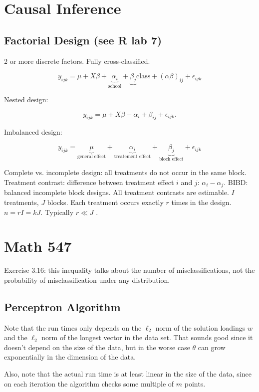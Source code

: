 \section{Causal Inference}

\subsection{Factorial Design (see R lab 7)}

2 or more discrete factors. Fully cross-classified.

\[
y_{ijk} = \mu + X \beta + \underbrace{\alpha_i}_{\text{school}} + \underbrace{\beta_j}{\text{class}} + (\alpha \beta)_{ij} + \epsilon_{ijk}
\]

Nested design:

\[
y_{ijk} = \mu + X \beta + \alpha_i + \beta_{ij} + \epsilon_{ijk}.
\]

Imbalanced design:

\[
y_{ijk} = \underbrace{\mu}_{\text{general effect}} + \underbrace{\alpha_i }_{\text{treatement effect}} + \underbrace{\beta_j}_{\text{block effect}} + \epsilon_{ijk}
\]

Complete vs. incomplete design: all treatments do not occur in the same block. Treatment contrast: difference between treatment effect \(i\) and \(j\): \(\alpha_i - \alpha_j\). BIBD: balanced incomplete block designs. All treatment contrasts are estimable. \(I\) treatments, \(J\) blocks. Each treatment occurs exactly \(r\) times in the design. \(n = rI = kJ\). Typically \(r \ll J\) .


\section{Math 547}

Exercise 3.16: this inequality talks about the number of misclassifications, not the probability of misclassification under any distribution.

\subsection{Perceptron Algorithm}

\begin{remark}

Note that the run times only depends on the \(\ell_2\) norm of the solution loadings \(w\) and the \(\ell_2\) norm of the longest vector in the data set. That sounds good since it doesn't depend on the size of the data, but in the worse case \(\theta\) can grow exponentially in the dimension of the data.

Also, note that the actual run time is at least linear in the size of the data, since on each iteration the algorithm checks some multiple of \(m\) points.

\end{remark}

